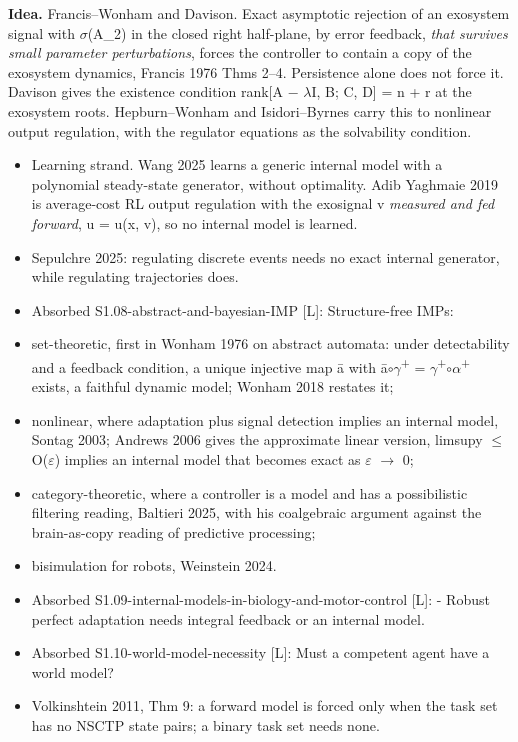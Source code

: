 \documentclass[10pt]{article}
\begin{document}
\textbf{Idea.} Francis--Wonham and Davison. Exact asymptotic rejection of an exosystem signal with \ensuremath{\sigma}(A\_2) in the closed right half-plane, by error feedback, \emph{that survives small parameter perturbations}, forces the controller to contain a copy of the exosystem dynamics, Francis 1976 Thms 2--4. Persistence alone does not force it. Davison gives the existence condition rank[A \ensuremath{-} \ensuremath{\lambda}I, B; C, D] = n + r at the exosystem roots. Hepburn--Wonham and Isidori--Byrnes carry this to nonlinear output regulation, with the regulator equations as the solvability condition.
\begin{itemize}[nosep,leftmargin=1.2em]
\item Learning strand. Wang 2025 learns a generic internal model with a polynomial steady-state generator, without optimality. Adib Yaghmaie 2019 is average-cost RL output regulation with the exosignal v \emph{measured and fed forward}, u = u(x, v), so no internal model is learned.
\item Sepulchre 2025: regulating discrete events needs no exact internal generator, while regulating trajectories does.
\item Absorbed S1.08-abstract-and-bayesian-IMP [L]: Structure-free IMPs:
\item set-theoretic, first in Wonham 1976 on abstract automata: under detectability and a feedback condition, a unique injective map \=a with \=a\ensuremath{\circ}\ensuremath{\gamma}\textsuperscript{+} = \ensuremath{\gamma}\textsuperscript{+}\ensuremath{\circ}\ensuremath{\alpha}\textsuperscript{+} exists, a faithful dynamic model; Wonham 2018 restates it;
\item nonlinear, where adaptation plus signal detection implies an internal model, Sontag 2003; Andrews 2006 gives the approximate linear version, limsup\textbar{}y\textbar{} \ensuremath{\leq} O(\ensuremath{\varepsilon}) implies an internal model that becomes exact as \ensuremath{\varepsilon} \ensuremath{\to} 0;
\item category-theoretic, where a controller is a model and has a possibilistic filtering reading, Baltieri 2025, with his coalgebraic argument against the brain-as-copy reading of predictive processing;
\item bisimulation for robots, Weinstein 2024.
\item Absorbed S1.09-internal-models-in-biology-and-motor-control [L]: - Robust perfect adaptation needs integral feedback or an internal model.
\item Absorbed S1.10-world-model-necessity [L]: Must a competent agent have a world model?
\item Volkinshtein 2011, Thm 9: a forward model is forced only when the task set has no NSCTP state pairs; a binary task set needs none.
\end{itemize}
\end{document}
